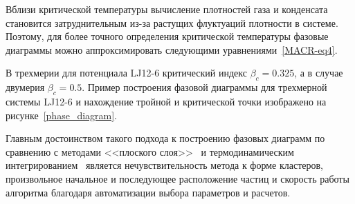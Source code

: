 \begin{table}[h!]
    \caption{Значения тройных и критических точек, а также коэффициентов фитирования $A$ и $a$ из уравнений \eqref{MACR-eq4} для двумерных и трехмерных систем Леннарда-Джонса, рассматриваемых в данной работе.}
    \label{PRIMe-Table2}
\end{table}



Вблизи критической температуры вычисление плотностей газа и конденсата становится затруднительным из-за растущих флуктуаций плотности в системе. Поэтому, для более точного определения критической температуры фазовые диаграммы можно аппроксимировать следующими уравнениями~\ref{MACR-eq4}.

В трехмерии для потенциала LJ12-6 критический индекс $\beta_c = 0.325$, а в случае двумерия $\beta_c = 0.5$.
Пример построения фазовой диаграммы для трехмерной системы LJ12-6 и нахождение тройной и критической точки изображено на рисунке~\ref{phase_diagram}.

Главным достоинством такого подхода к построению фазовых диаграмм по сравнению с методами <<плоского слоя>>~\cite{10.1021/jp806127j, 10.1021/jp1117213} и термодинамическим интегрированием~\cite{10.1088/0953-8984/21/46/465104} является нечувствительность метода к форме кластеров, произвольное начальное и последующее расположение частиц и скорость работы алгоритма благодаря автоматизации выбора параметров и расчетов.



